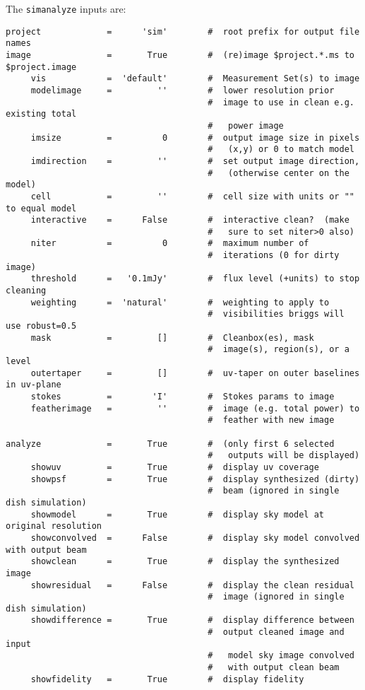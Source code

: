 The {\tt simanalyze} inputs are:
\small
\begin{verbatim}
project             =      'sim'        #  root prefix for output file names
image               =       True        #  (re)image $project.*.ms to $project.image
     vis            =  'default'        #  Measurement Set(s) to image
     modelimage     =         ''        #  lower resolution prior
                                        #  image to use in clean e.g. existing total
                                        #   power image
     imsize         =          0        #  output image size in pixels
                                        #   (x,y) or 0 to match model
     imdirection    =         ''        #  set output image direction,
                                        #   (otherwise center on the model)
     cell           =         ''        #  cell size with units or "" to equal model
     interactive    =      False        #  interactive clean?  (make
                                        #   sure to set niter>0 also)
     niter          =          0        #  maximum number of
                                        #  iterations (0 for dirty image)
     threshold      =   '0.1mJy'        #  flux level (+units) to stop cleaning
     weighting      =  'natural'        #  weighting to apply to
                                        #  visibilities briggs will use robust=0.5
     mask           =         []        #  Cleanbox(es), mask
                                        #  image(s), region(s), or a level
     outertaper     =         []        #  uv-taper on outer baselines in uv-plane
     stokes         =        'I'        #  Stokes params to image
     featherimage   =         ''        #  image (e.g. total power) to
                                        #  feather with new image

analyze             =       True        #  (only first 6 selected
                                        #   outputs will be displayed)
     showuv         =       True        #  display uv coverage
     showpsf        =       True        #  display synthesized (dirty)
                                        #  beam (ignored in single dish simulation)
     showmodel      =       True        #  display sky model at original resolution
     showconvolved  =      False        #  display sky model convolved with output beam
     showclean      =       True        #  display the synthesized image
     showresidual   =      False        #  display the clean residual
                                        #  image (ignored in single dish simulation)
     showdifference =       True        #  display difference between
                                        #  output cleaned image and input
                                        #   model sky image convolved
                                        #   with output clean beam
     showfidelity   =       True        #  display fidelity


\end{verbatim}
